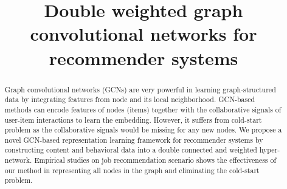\documentclass[manuscript,screen,review]{acmart}
\begin{document}
\title{Double weighted graph convolutional networks for recommender systems}

\iffalse
\author{Ben Trovato}
\authornote{Both authors contributed equally to this research.}
\email{trovato@corporation.com}
\orcid{1234-5678-9012}
\author{G.K.M. Tobin}
\authornotemark[1]
\email{webmaster@marysville-ohio.com}
\affiliation{%
  \institution{Institute for Clarity in Documentation}
  \streetaddress{P.O. Box 1212}
  \city{Dublin}
  \state{Ohio}
  \country{USA}
  \postcode{43017-6221}
}
\fi
\renewcommand{\shortauthors}{Trovato and Tobin, et al.}

\begin{abstract}

Graph convolutional networks (GCNs) are very powerful in learning graph-structured data by integrating features from node and its local neighborhood. GCN-based methods can encode features of nodes (items) together with the collaborative signals of user-item interactions to learn the embedding. However, it suffers from cold-start problem as the collaborative signals would be missing for any new nodes. We propose a novel GCN-based representation learning framework for recommender systems by constructing
content and behavioral data into a double connected and weighted hyper-network. Empirical studies on job recommendation scenario shows the effectiveness of our method in representing all nodes in the graph and eliminating the cold-start problem. 

\end{abstract}
\end{document}
